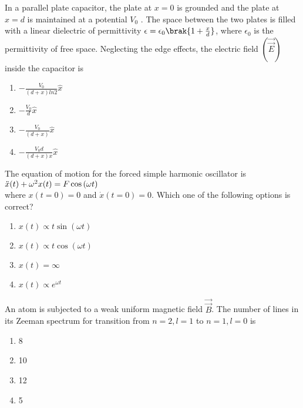 \iffalse
\title{2024-PH- 40-52}
\author{EE24BTECH11016 - DHWANITH M DODDAHUNDI}
\section{ph}
\chapter{2024}
\fi

\item In a parallel plate capacitor, the plate at $x=0$ is grounded and the plate at $x=d$ is
maintained at a potential $V_{0}$ . The space between the two plates is filled with a linear
dielectric of permittivity $\epsilon=\epsilon_{0}\brak{1+\frac{x}{d}}$, where $\epsilon_{0}$ is the permittivity of free space.
Neglecting the edge effects, the electric field $(\Vec{\overrightarrow{E}})$ inside the capacitor is
\begin{enumerate}
    \item $-\frac{V_{0}}{(d+x)ln 2}\hat{x}$
    \item $-\frac{V_{0}}{d}\hat{x}$
    \item $-\frac{V_{0}}{(d+x)}\hat{x}$
    \item $-\frac{V_{0}d}{(d+x)x}\hat{x}$
\end{enumerate}
\item The equation of motion for the forced simple harmonic oscillator is \\
$\Ddot{x}(t)+\omega^{2}x(t)=F\cos{(\omega t)}$ \\
    where $x(t=0)=0$ and $\Dot{x}(t=0)=0$. Which one of the following options is
correct?
    \begin{enumerate}
        \item $x(t)\propto t\sin{(\omega t)}$
        \item $x(t)\propto t\cos{(\omega t)}$
        \item $x(t)=\infty$
        \item $x(t)\propto e^{\omega t}$
    \end{enumerate}
    \item An atom is subjected to a weak uniform magnetic field $\Vec{\overrightarrow{B}}$. The number of lines in its Zeeman spectrum for transition from $n=2,l=1$ to $n=1,l=0$ is
    \begin{enumerate}
        \item 8
        \item 10
        \item 12
        \item 5
    \end{enumerate}
